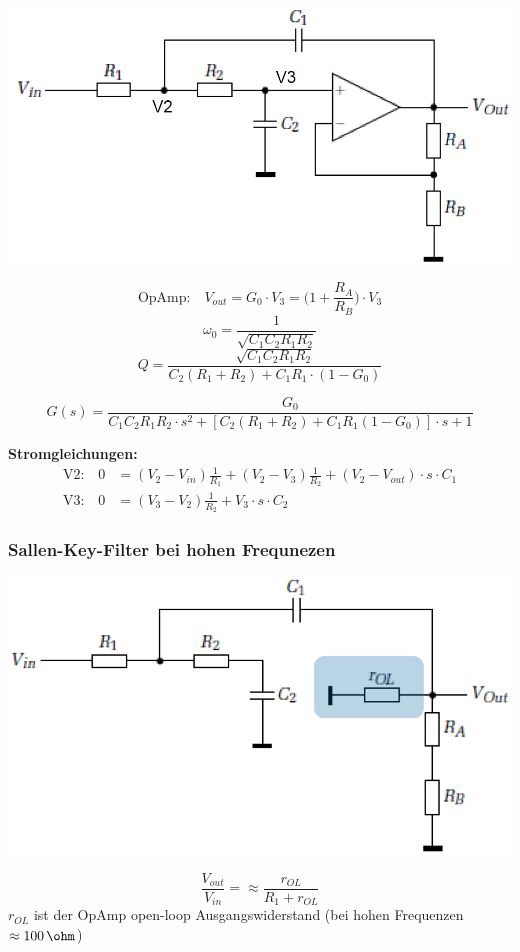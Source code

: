 \begin{minipage}[c]{0.4\columnwidth}
    \includegraphics[width=\columnwidth]{images/sallen_key.png}
\end{minipage}
\hfill
\begin{minipage}[c]{0.58\columnwidth}
    $$ \text{OpAmp:} \quad  V_{out} = G_0 \cdot V_3 = \Big(1 + \frac{R_A}{R_B} \Big) \cdot V_3 $$
    $$ \omega_0 = \frac{1}{\sqrt{C_1 C_2 R_1 R_2}} $$
    $$ Q = \frac{\sqrt{C_1 C_2 R_1 R_2}}{ C_2 (R_1 + R_2) + C_1 R_1 \cdot (1 - G_0)} $$
\end{minipage}

$$ \boxed{ G(s) = \frac{G_0}{ C_1 C_2 R_1 R_2 \cdot s^2 + [ C_2 (R_1 + R_2) + C_1 R_1 (1 - G_0) ] \cdot s + 1} } $$

\textbf{Stromgleichungen:}
\begin{align*}
    \text{V2:} \quad 0 &= (V_2 - V_{in}) \frac{1}{R_1} + (V_2 - V_3) \frac{1}{R_2} + (V_2 - V_{out}) \cdot s \cdot C_1  \\
    \text{V3:} \quad 0 &= (V_3 - V_2) \frac{1}{R_2} + V_3  \cdot s \cdot C_2 
\end{align*}


\subsubsection{Sallen-Key-Filter bei hohen Frequnezen}

\begin{minipage}[c]{0.4\columnwidth}  
    \includegraphics[width=\columnwidth]{images/sallen_key_hohe_frequenzen.png}
\end{minipage}
\hfill
\begin{minipage}[c]{0.58\columnwidth}
    $$ \boxed{ \frac{V_{out}}{V_{in}} = \approx \frac{r_{OL}}{R_1 + r_{OL}} }$$
    $r_{OL}$ ist der OpAmp open-loop Ausgangswiderstand (bei hohen Frequenzen $\approx 100 \, \ohm$)
\end{minipage}

